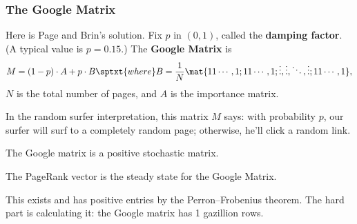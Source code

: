 \begin{frame}
\frametitle{The Google Matrix}

Here is Page and Brin's solution.
\pause
Fix $p$ in $(0,1)$, called the \textbf{damping factor}.  (A typical value is
$p=0.15$.) 
\pause
The \textbf{Google Matrix} is
\[ M = (1-p)\cdot A + p\cdot B
\sptxt{where}
B = \frac 1N\mat{1 1 \cdots, 1; 1 1 \cdots, 1;
  \vdots, \vdots, \ddots, \vdots; 1 1 \cdots, 1}, \]
$N$ is the total number of pages, and $A$ is the importance matrix.

\pause\medskip
In the random surfer interpretation, this matrix $M$ says: with probability $p$,
our surfer will surf to a completely random page; otherwise, he'll click a
random link.

\pause
\begin{lem}
  The Google matrix is a positive stochastic matrix.
\end{lem}

\pause\medskip
\begin{bluebox}{.8\linewidth}\centering
  The PageRank vector is the steady state for the Google Matrix.
\end{bluebox}

\pause
This exists and has positive entries by the Perron--Frobenius theorem.
\pause
The hard part is calculating it: the Google matrix has
1 gazillion rows.

\medskip

\end{frame}


